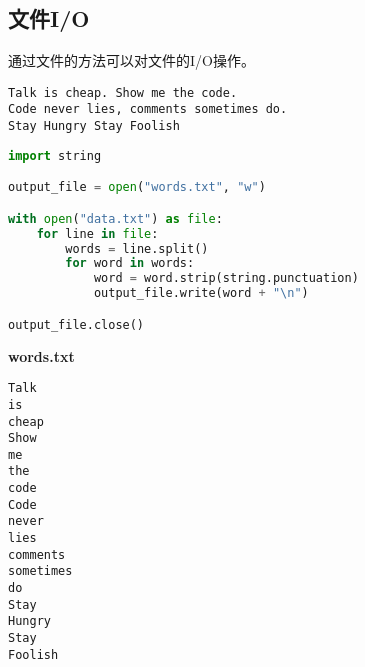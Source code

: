 \subsection{文件I/O}

通过文件的方法可以对文件的I/O操作。\\

\begin{table}[H]
    \centering
    \caption{文件I/O}
\end{table}

\vspace{0.5cm}


\begin{lstlisting}[title=data.txt]
Talk is cheap. Show me the code.
Code never lies, comments sometimes do.
Stay Hungry Stay Foolish
\end{lstlisting}

\begin{lstlisting}[language=Python]
import string

output_file = open("words.txt", "w")

with open("data.txt") as file:
    for line in file:
        words = line.split()
        for word in words:
            word = word.strip(string.punctuation)
            output_file.write(word + "\n")

output_file.close()
\end{lstlisting}

\begin{tcolorbox}
    \textbf{words.txt}
    \begin{verbatim}
Talk
is
cheap
Show
me
the
code
Code
never
lies
comments
sometimes
do
Stay
Hungry
Stay
Foolish        
	\end{verbatim}
\end{tcolorbox}

